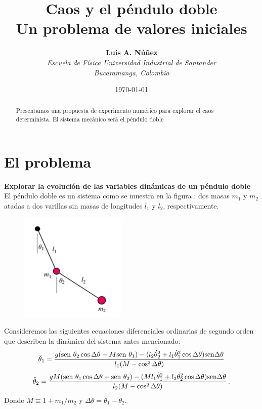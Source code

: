 \documentclass[spanish,notitlepage,letterpaper,11pt]{article} %
\begin{document}
\title{Caos y el péndulo doble \\ 
Un problema de valores iniciales}
\author{
\textbf{Luis A. Núñez} \\ 
\textit{Escuela de Física} \textit{Universidad Industrial de Santander} \\ 
\textit{Bucaramanga, Colombia}
}
\date{\today}
\maketitle
\begin{abstract}
    Presentamos una propuesta de experimento numérico para explorar el caos determinísta. El sistema mecánico será el péndulo doble  
\end{abstract}

\section{El problema}
\textbf{Explorar la evolución de las variables dinámicas de un péndulo doble}
El péndulo doble es un sistema como se muestra en la figura \label{Pendulo2}: dos masas $m_1$ y $m_2$ atadas a dos varillas sin masas de longitudes $l_1$ y $l_2$, respectivamente. 
\begin{figure}[ht!]
\centering
\includegraphics[width=2in]{Figuras/Pendulo2.png}
\label{Pendulo2}
\end{figure}

Consideremos las siguientes ecuaciones diferenciales ordinarias de segundo orden que describen la dinámica del sistema antes mencionado:
\begin{equation}
\ddot{\theta}_1 = \frac{g({\rm sen}~\theta_2\cos \Delta \theta -M{\rm sen}~\theta_1 ) -(l_2 \dot{\theta}_2^2 + l_1 \dot{\theta}_1^2\cos \Delta \theta){\rm sen}\Delta \theta}
{l_1(M -\cos^2 \Delta \theta)}
\label{ddtheta1}
\end{equation}
\begin{equation}
\ddot{\theta}_2 = \frac{gM({\rm sen}~\theta_1\cos \Delta \theta -{\rm sen}~\theta_2 ) -(M l_1 \dot{\theta}_1^2 + l_2 \dot{\theta}_2^2\cos \Delta \theta){\rm sen}\Delta \theta}
{l_2(M -\cos^2 \Delta \theta)} \, .   
\label{ddtheta2}
\end{equation}
Donde $M \equiv 1 + m_1/m_2$ y $\Delta \theta = \theta_1 -\theta_2$. 
\end{document}
